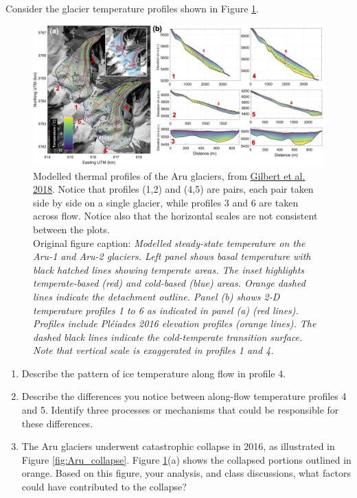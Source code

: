 \documentclass[12pt]{article}
\newenvironment{problem}[2][Problem]{\begin{trivlist}
\item[\hskip \labelsep {\bfseries #1}\hskip \labelsep {\bfseries #2.}]}{\end{trivlist}}
\begin{document}
\begin{problem}{2}
[5 points] Consider the glacier temperature profiles shown in Figure \ref{fig:Aru_profiles}.  

\begin{figure}[b]
    \centering
    \includegraphics[width=1.0\linewidth]{figs/Figure_5b copy.jpg}
    \caption{Modelled thermal profiles of the Aru glaciers, from \href{https://tc.copernicus.org/articles/12/2883/2018/}{Gilbert et al. 2018}.  Notice that profiles (1,2) and (4,5) are pairs, each pair taken side by side on a single glacier, while profiles 3 and 6 are taken across flow.  Notice also that the horizontal scales are not consistent between the plots. \\
    Original figure caption: {\em Modelled steady-state temperature on the Aru-1 and Aru-2 glaciers. Left panel shows basal temperature with black hatched lines showing temperate areas. The inset highlights temperate-based (red) and cold-based (blue) areas. Orange dashed lines indicate the detachment outline. Panel (b) shows 2-D temperature profiles 1 to 6 as indicated in panel (a) (red lines). Profiles include Pléiades 2016 elevation profiles (orange lines). The dashed black lines indicate the cold-temperate transition surface. Note that vertical scale is exaggerated in profiles 1 and 4.}}
    \label{fig:Aru_profiles}
\end{figure}


\renewcommand{\labelenumi}{(\alph{enumi})}
\begin{enumerate}[itemsep=2pt]
   \item Describe the pattern of ice temperature along flow in profile 4.
   \item  Describe the differences you notice between along-flow temperature profiles 4 and 5.  Identify three processes or mechanisms that could be responsible for these differences.
   \item The Aru glaciers underwent catastrophic collapse in 2016, as illustrated in Figure \ref{fig:Aru_collapse}.  Figure \ref{fig:Aru_profiles}(a) shows the collapsed portions outlined in orange.  Based on this figure, your analysis, and class discussions, what factors could have contributed to the collapse?
\end{enumerate}



\end{problem}
\end{document}
